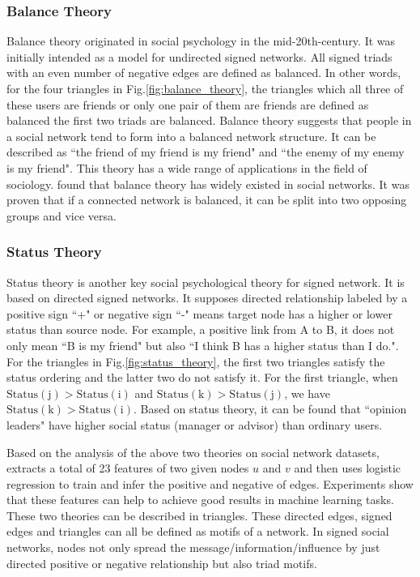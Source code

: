 \documentclass[runningheads]{llncs}
\begin{document}
\subsubsection{Balance Theory}

Balance theory originated in social psychology in the mid-20th-century\cite{heider1946attitudes}.
It was initially intended as a model for undirected signed networks. 
All signed triads with an even number of negative edges are defined as balanced. 
In other words, for the four triangles in Fig.\ref{fig:balance_theory}, the triangles which all three of these users are friends or only one pair of them are friends are defined as balanced \ie the first two triads are balanced.
Balance theory suggests that people in a social network tend to form into a balanced network structure. 
It can be described as ``the friend of my friend is my friend" and ``the enemy of my enemy is my friend".
This theory has a wide range of applications in the field of sociology. \cite{leskovec2010predicting} found that balance theory has widely existed in social networks. 
It was proven that if a connected network is balanced, it can be split into two opposing groups and vice versa\cite{easley2010networks}. 

\subsubsection{Status Theory}

Status theory is another key social psychological theory for signed network.
It is based on directed signed networks.
It supposes directed relationship labeled by a positive sign ``+" or negative sign ``-"  means target node has a higher or lower status than source node\cite{tang2012inferring}. 
For example, a positive link from A to B, it does not only mean ``B is my friend" but also ``I think B has a higher status than I do.".
For the triangles in Fig.\ref{fig:status_theory}, the first two triangles satisfy the status ordering and the latter two do not satisfy it. 
For the first triangle, when $\mathrm{Status(j)} > \mathrm{Status(i)}$ and $\mathrm{Status(k)} > \mathrm{Status(j)}$, we have $\mathrm{Status(k)} > \mathrm{Status(i)}$. 
Based on status theory, it can be found that ``opinion leaders" have higher social status (manager or advisor) than ordinary users\cite{tang2012inferring}. 



Based on the analysis of the above two theories on social network datasets, \cite{leskovec2010predicting} extracts a total of 23 features of two given nodes $u$ and $v$ and then uses logistic regression to train and infer the positive and negative of edges. 
Experiments show that these features can help to achieve good results in machine learning tasks. 
These two theories can be described in triangles. These directed edges, signed edges and triangles can all be defined as motifs of a network\cite{milo2002network}. 
In signed social networks, nodes not only spread the message/information/influence by just directed positive or negative relationship but also triad motifs. 
\end{document}
